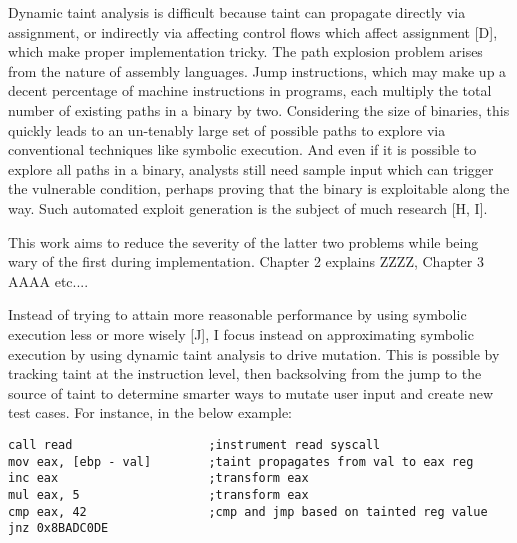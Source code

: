 \documentclass[11pt,expanded,copyright]{fsuthesis}
\begin{document}
 Dynamic taint analysis is difficult because taint can propagate directly via assignment, or indirectly via affecting control flows which affect assignment [D], which make proper implementation tricky. The path explosion problem arises from the nature of assembly languages. Jump instructions, which may make up a decent percentage of machine instructions in programs, each multiply the total number of existing paths in a binary by two. Considering the size of binaries, this quickly leads to an un-tenably large set of possible paths to explore via conventional techniques like symbolic execution. And even if it is possible to explore all paths in a binary, analysts still need sample input which can trigger the vulnerable condition, perhaps proving that the binary is exploitable along the way. Such automated exploit generation is the subject of much research [H, I].

This work aims to reduce the severity of the latter two problems while being wary of the first during implementation. Chapter 2 explains ZZZZ, Chapter 3 AAAA etc....

Instead of trying to attain more reasonable performance by using symbolic execution less or more wisely [J], I focus instead on approximating symbolic execution by using dynamic taint analysis to drive mutation. This is possible by tracking taint at the instruction level, then backsolving from the jump to the source of taint to determine smarter ways to mutate user input and create new test cases. For instance, in the below example:


\begin{lstlisting}[style=asmstyle]
call read					;instrument read syscall
mov eax, [ebp - val]		;taint propagates from val to eax reg
inc eax						;transform eax
mul eax, 5					;transform eax
cmp eax, 42					;cmp and jmp based on tainted reg value
jnz 0x8BADC0DE
\end{lstlisting}
\end{document}
